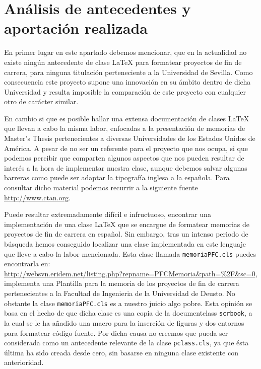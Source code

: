 \chapter{An\'alisis de antecedentes y aportaci\'on realizada}\label{analanteced}
 
	En primer lugar en este apartado debemos mencionar, que en la actualidad no existe ning\'un antecedente de clase \LaTeX{}
	para formatear proyectos de fin de carrera, para ninguna titulaci\'on perteneciente a la Universidad de Sevilla. Como
	consecuencia este proyecto supone una innovaci\'on en su \'ambito dentro de dicha Universidad y resulta imposible la 
	comparaci\'on de este proyecto con cualquier otro de car\'acter similar.
	
	En cambio si que es posible hallar una extensa documentaci\'on de clases \LaTeX{} que llevan a cabo la misma labor, 
	enfocadas a la presentaci\'on de memorias de Master's Thesis pertenecientes a diversas Universidades de los Estados 
	Unidos de Am\'erica. A pesar de no ser un referente para el proyecto que nos ocupa, si que podemos percibir que 
	comparten algunos aspectos que nos pueden resultar de inter\'es a la hora de implementar nuestra clase, aunque debemos
	salvar algunas barreras como puede ser adaptar la tipograf\'ia inglesa a la espa\~nola. Para consultar dicho material
	podemos recurrir a la siguiente fuente \url{http://www.ctan.org}.
	
	Puede resultar extremadamente dif\'icil e infructuoso, encontrar una implementaci\'on de una clase \LaTeX{} que se 
	encargue de formatear memorias de proyectos de fin de carrera en espa\~nol. Sin embargo, tras un intenso periodo de
	b\'usqueda hemos conseguido localizar una clase implementada en este lenguaje que lleve a cabo la labor mencionada.
	Esta clase llamada \texttt{memoriaPFC.cls} puedes encontrarla en:\\	
	\url{http://websvn.eridem.net/listing.php?repname=PFCMemoria&path=%2F&sc=0},
	implementa una Plantilla para 
	la memoria de los proyectos de fin de carrera pertenecientes a la Facultad de Ingenieria de la Universidad de Deusto.
	No obstante la clase \texttt{memoriaPFC.cls} es a nuestro juicio algo pobre. Esta opini\'on se basa en el hecho 
	de que dicha clase es una copia de la documentclass \texttt{scrbook}, a la cual se le ha a\~nadido una macro para 
	la inserci\'on de figuras y dos entornos para formatear c\'odigo fuente. Por dicha causa no creemos que pueda ser 
	considerada como un antecedente relevante de la clase \texttt{pclass.cls}, ya que \'esta \'ultima ha sido creada 
	desde cero, sin basarse en ninguna clase existente con anterioridad.
